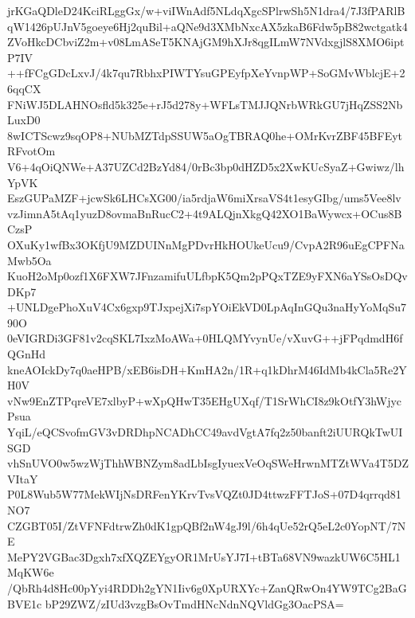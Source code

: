 jrKGaQDleD24KciRLggGx/w+viIWnAdf5NLdqXgcSPlrwSh5N1dra4/7J3fPARlB
qW1426pUJnV5goeye6Hj2quBil+aQNe9d3XMbNxcAX5zkaB6Fdw5pB82wctgatk4
ZVoHkcDCbviZ2m+v08LmASeT5KNAjGM9hXJr8qgILmW7NVdxgjlS8XMO6iptP7IV
++fFCgGDcLxvJ/4k7qu7RbhxPIWTYsuGPEyfpXeYvnpWP+SoGMvWblcjE+26qqCX
FNiWJ5DLAHNOsfld5k325e+rJ5d278y+WFLsTMJJQNrbWRkGU7jHqZSS2NbLuxD0
8wICTScwz9sqOP8+NUbMZTdpSSUW5aOgTBRAQ0he+OMrKvrZBF45BFEytRFvotOm
V6+4qOiQNWe+A37UZCd2BzYd84/0rBc3bp0dHZD5x2XwKUcSyaZ+Gwiwz/lhYpVK
EszGUPaMZF+jcwSk6LHCsXG00/ia5rdjaW6miXrsaVS4t1esyGIbg/ums5Vee8lv
vzJimnA5tAq1yuzD8ovmaBnRucC2+4t9ALQjnXkgQ42XO1BaWywcx+OCus8BCzsP
OXuKy1wfBx3OKfjU9MZDUINnMgPDvrHkHOUkeUcu9/CvpA2R96uEgCPFNaMwb5Oa
KuoH2oMp0ozf1X6FXW7JFnzamifuULfbpK5Qm2pPQxTZE9yFXN6aYSsOsDQvDKp7
+UNLDgePhoXuV4Cx6gxp9TJxpejXi7spYOiEkVD0LpAqInGQu3naHyYoMqSu790O
0eVIGRDi3GF81v2cqSKL7IxzMoAWa+0HLQMYvynUe/vXuvG++jFPqdmdH6fQGnHd
kneAOIckDy7q0aeHPB/xEB6isDH+KmHA2n/1R+q1kDhrM46IdMb4kCla5Re2YH0V
vNw9EnZTPqreVE7xlbyP+wXpQHwT35EHgUXqf/T1SrWhCI8z9kOtfY3hWjycPsua
YqiL/eQCSvofmGV3vDRDhpNCADhCC49avdVgtA7fq2z50banft2iUURQkTwUISGD
vhSnUVO0w5wzWjThhWBNZym8adLbIsgIyuexVeOqSWeHrwnMTZtWVa4T5DZVItaY
P0L8Wub5W77MekWIjNsDRFenYKrvTvsVQZt0JD4ttwzFFTJoS+07D4qrrqd81NO7
CZGBT05I/ZtVFNFdtrwZh0dK1gpQBf2nW4gJ9l/6h4qUe52rQ5eL2c0YopNT/7NE
MePY2VGBac3Dgxh7xfXQZEYgyOR1MrUsYJ7I+tBTa68VN9wazkUW6C5HL1MqKW6e
/QbRh4d8Hc00pYyi4RDDh2gYN1Iiv6g0XpURXYc+ZanQRwOn4YW9TCg2BaGBVE1c
bP29ZWZ/zIUd3vzgBsOvTmdHNcNdnNQVldGg3OacPSA=
